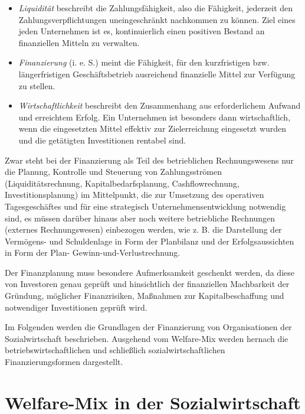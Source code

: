 \documentclass[
  letterpaper,
]{book}
\begin{document}
\begin{itemize}
\item
  \emph{Liquidität} beschreibt die Zahlungsfähigkeit, also die
  Fähigkeit, jederzeit den Zahlungsverpflichtungen uneingeschränkt
  nachkommen zu können. Ziel eines jeden Unternehmen ist es,
  kontinuierlich einen positiven Bestand an finanziellen Mitteln zu
  verwalten.
\item
  \emph{Finanzierung} (i. e. S.) meint die Fähigkeit, für den
  kurzfristigen bzw. längerfristigen Geschäftsbetrieb ausreichend
  finanzielle Mittel zur Verfügung zu stellen.
\item
  \emph{Wirtschaftlichkeit} beschreibt den Zusammenhang aus
  erforderlichem Aufwand und erreichtem Erfolg. Ein Unternehmen ist
  besonders dann wirtschaftlich, wenn die eingesetzten Mittel effektiv
  zur Zielerreichung eingesetzt wurden und die getätigten Investitionen
  rentabel sind.
\end{itemize}

Zwar steht bei der Finanzierung als Teil des betrieblichen
Rechnungswesens nur die Planung, Kontrolle und Steuerung von
Zahlungsströmen (Liquiditätsrechnung, Kapitalbedarfsplanung,
Cashflowrechnung,~ Investitionsplanung) im Mittelpunkt, die zur
Umsetzung des operativen Tagesgeschäftes und für eine strategisch
Unternehmensentwicklung notwendig sind, es müssen darüber hinaus aber
noch weitere betriebliche Rechnungen (externes Rechnungswesen)
einbezogen werden, wie z. B. die Darstellung der Vermögens- und
Schuldenlage in Form der Planbilanz und der Erfolgsaussichten in Form
der Plan- Gewinn-und-Verlustrechnung.

Der Finanzplanung muss besondere Aufmerksamkeit geschenkt werden, da
diese von Investoren genau geprüft und hinsichtlich der finanziellen
Machbarkeit der Gründung, möglicher Finanzrisiken, Maßnahmen zur
Kapitalbeschaffung und notwendiger Investitionen geprüft wird.

Im Folgenden werden die Grundlagen der Finanzierung von Organisationen
der Sozialwirtschaft beschrieben. Ausgehend vom Welfare-Mix werden
hernach die betriebswirtschaftlichen und schließlich
sozialwirtschaftlichen Finanzierungsformen dargestellt.

\section{Welfare-Mix in der
Sozialwirtschaft}\label{welfare-mix-sozialwirtschaft}
\end{document}
